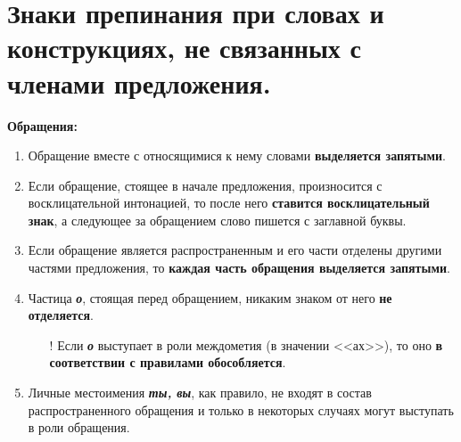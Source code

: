 \documentclass[main]{subfile}
\begin{document}
\section{Знаки препинания при словах и конструкциях, не связанных с членами предложения.}
\textbf{Обращения:}

\begin{enumerate}
      \item Обращение вместе с относящимися к нему словами \textbf{выделяется запятыми}. \newline
      \item Если обращение, стоящее в начале предложения, произносится с восклицательной интонацией, то после него \textbf{ставится восклицательный знак}, а следующее за обращением слово пишется с заглавной буквы. \newline
      \item Если обращение является распространенным и его части отделены другими частями предложения, то \textbf{каждая часть обращения выделяется запятыми}. \newline
      \item Частица \textit{\textbf{о}}, стоящая перед обращением, никаким знаком от него \textbf{не отделяется}. \newline
            \begin{itemize}
                  \item[!] Если \textit{\textbf{о}} выступает в роли междометия (в значении <<ах>>), то оно \textbf{в соответствии с правилами обособляется}. \newline
            \end{itemize}
      \item Личные местоимения \textit{\textbf{ты, вы}}, как правило, не входят в состав распространенного обращения и только в некоторых случаях могут выступать в роли обращения. \newline
\end{enumerate}
\end{document}
